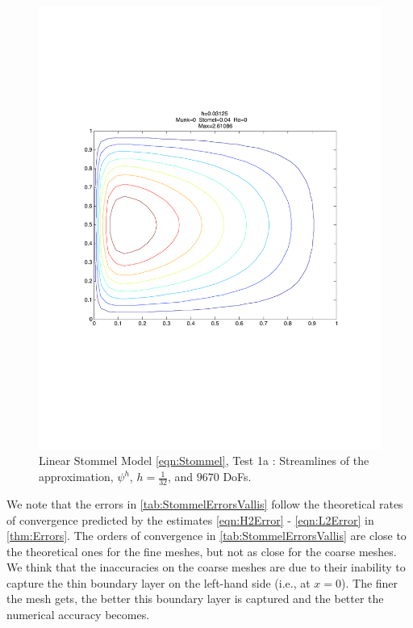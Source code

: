 \begin{figure}%
  \begin{center}
    \includegraphics[scale=0.5]{Figures/LinearStommelVallis.pdf}
    \caption{Linear Stommel Model \eqref{eqn:Stommel}, Test 1a \cite{Vallis06}: Streamlines of the approximation,
    $\psi^h$, $h=\frac{1}{32}$, and $9670$ DoFs.}
    \label{fig:StommelVallis}
  \end{center}
\end{figure}
We note that the errors in \autoref{tab:StommelErrorsVallis} follow the
theoretical rates of convergence predicted by the estimates \eqref{eqn:H2Error}
- \eqref{eqn:L2Error} in \autoref{thm:Errors}. The orders of convergence in
\autoref{tab:StommelErrorsVallis} are close to the theoretical ones for the fine
meshes, but not as close for the coarse meshes. We think that the inaccuracies
on the coarse meshes are due to their inability to capture the thin boundary
layer on the left-hand side (i.e., at $x=0$). The finer the mesh gets, the
better this boundary layer is captured and the better the numerical accuracy
becomes.

